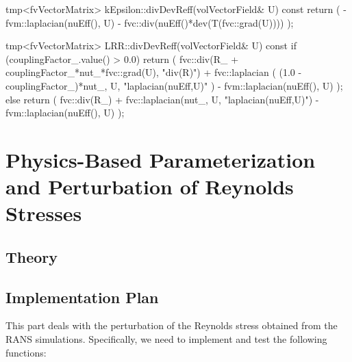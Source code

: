 \documentclass[paper = letter, fontsize = 11pt]{scrartcl} %
\begin{document}
\begin{CPP}
  tmp<fvVectorMatrix> kEpsilon::divDevReff(volVectorField& U) const { return ( -
    fvm::laplacian(nuEff(), U) - fvc::div(nuEff()*dev(T(fvc::grad(U)))) ); }
\end{CPP}

\begin{CPP}
tmp<fvVectorMatrix> LRR::divDevReff(volVectorField& U) const
{
    if (couplingFactor_.value() > 0.0)
    {
        return
        (
            fvc::div(R_ + couplingFactor_*nut_*fvc::grad(U), "div(R)")
          + fvc::laplacian
            (
                 (1.0 - couplingFactor_)*nut_,
                 U,
                 "laplacian(nuEff,U)"
            )
          - fvm::laplacian(nuEff(), U)
        );
    }
    else
    {
        return
        (
            fvc::div(R_)
          + fvc::laplacian(nut_, U, "laplacian(nuEff,U)")
          - fvm::laplacian(nuEff(), U)
        );
    }
}
\end{CPP}


\section{Physics-Based Parameterization and Perturbation of Reynolds Stresses}

\subsection{Theory}

\subsection{Implementation Plan}
This part deals with the perturbation of the Reynolds stress obtained from the RANS
simulations. Specifically, we need to implement and test the following functions:

\end{document}
